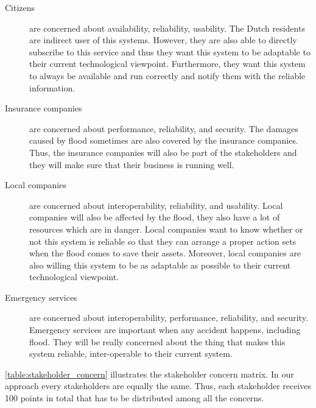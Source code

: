 \begin{description}
\item[Citizens] are concerned about availability, reliability, usability. The Dutch residents are indirect user of this systems. However, they are also able to directly subscribe to this service and thus they want this system to be adaptable to their current technological viewpoint. Furthermore, they want this system to always be available and run correctly and notify them with the reliable information.
\item[Insurance companies] are concerned about performance, reliability, and security. The damages caused by flood sometimes are also covered by the insurance companies. Thus, the insurance companies will also be part of the stakeholders and they will make sure that their business is running well.
\item[Local companies] are concerned about interoperability, reliability, and usability. Local companies will also be affected by the flood, they also have a lot of resources which are in danger. Local companies want to know whether or not this system is reliable so that they can arrange a proper action sets when the flood comes to save their assets. Moreover, local companies are also willing this system to be as adaptable as possible to their current technological viewpoint.
\item[Emergency services] are concerned about interoperability, performance, reliability, and security. Emergency services are important when any accident happens, including flood. They will be really concerned about the thing that makes this system reliable, inter-operable to their current system.
\end{description}

\autoref{table:stakeholder_concern} illustrates the stakeholder concern matrix. In our approach every stakeholders are equally the same. Thus, each stakeholder receives 100 points in total that has to be distributed among all the concerns.

